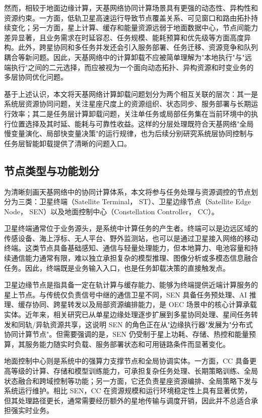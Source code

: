 然而，相较于地面边缘计算，天基网络协同计算场景具有更强的动态性、异构性和资源约束。一方面，低轨卫星高速运行导致节点覆盖关系、可见窗口和路由拓扑持续变化；另一方面，星上计算、缓存和能量资源远弱于地面数据中心，节点间能力差异显著，且业务需求在时延容忍、任务规模、能耗预算和优先级等方面高度异构。此外，跨星协同和多任务并发还会引入服务部署、任务迁移、资源竞争和队列耦合等新问题\cite{Tang2024TwoTimescaleJSAC,Zhang2024PeerOffloading,Zhou2024MobilityAware}。因此，天基网络中的计算卸载不应被简单理解为"本地执行"与"远端执行"之间的二元选择，而应被视为一个面向动态拓扑、异构资源和时变业务的多层协同优化问题。

基于上述认识，本文将天基网络计算卸载问题划分为两个相互关联的层次：其一是系统层资源协同问题，关注星座尺度上的资源组织、状态同步、服务部署与长期运行效率；其二是任务层计算卸载问题，关注单任务或局部任务集在当前环境中的执行位置选择及其时延、能耗与可靠性收益。这样的分层处理既符合天基网络"全局慢变量演化、局部快变量决策"的运行规律，也为后续分别研究系统层协同控制与任务层智能卸载提供了清晰的问题入口。

\subsection{节点类型与功能划分}

为清晰刻画天基网络中的协同计算体系，本文将参与任务处理与资源调控的节点划分为三类：卫星终端（Satellite Terminal， ST）、卫星边缘节点（Satellite Edge Node， SEN）以及地面控制中心（Constellation Controller， CC）。

卫星终端通常位于业务源头，是系统中计算任务的产生者。终端可以是边远区域的传感设备、海上浮标、无人平台、野外监测站，也可以是通过卫星接入网络的移动终端。这类节点具备基础感知、通信与轻量处理能力，但本地算力、电池容量和持续通信能力通常有限，难以独立承担复杂的模型推理、图像分析或多模态信息融合任务。因此，终端既是业务输入入口，也是任务卸载决策的直接触发点。

卫星边缘节点是指具备一定在轨计算与缓存能力、能够为终端提供近端计算服务的星上节点。与传统仅负责信号中继的通信卫星不同，SEN 具备任务预处理、AI 推理、缓存协同、跨星转发以及局部资源编排能力，是 OEC 场景中的核心计算承载实体\cite{Yin2025OECSurvey,Huang2024ICNLSMC}。近年来，相关研究已从单星边缘处理逐步扩展到多星协同处理、星间任务转发和同轨/异轨资源共享，这说明 SEN 的角色正在从"边缘执行器"发展为"分布式协同计算节点"\cite{Zhang2024PeerOffloading,Tang2024TwoTimescaleJSAC}。但需要强调的是，SEN 仍受制于星上功耗、存储、热控和能量预算，其服务能力随实时负载、服务部署状态和可用链路条件而显著变化。

地面控制中心则是系统中的强算力支撑节点和全局协调实体。一方面，CC 具备更高等级的计算、存储和模型训练能力，可承担复杂任务处理、长期策略训练、全局状态融合和跨域控制等功能；另一方面，它还负责星座资源编排、全局策略下发与系统运行维护。相比 SEN，CC 在资源规模和运行环境稳定性上具有显著优势，但其处理路径更长，通常需要经历额外的星地传输与调度开销，因此并不总适合承担强实时业务。

